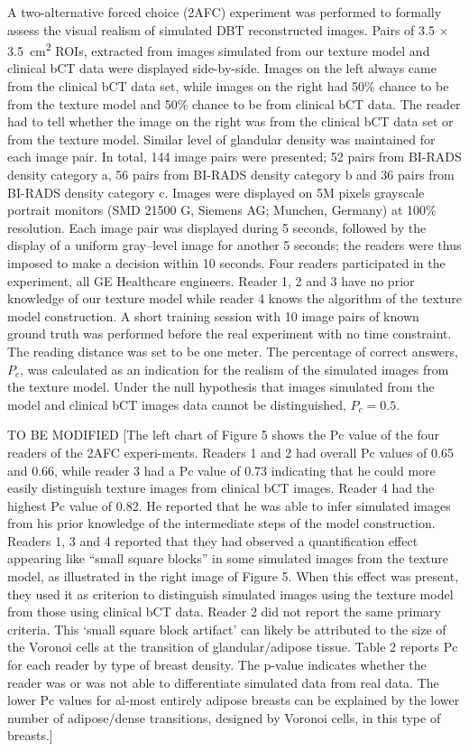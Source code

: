 \documentclass[journal]{IEEEtran}
\begin{document}
A two-alternative forced choice (2AFC) experiment was performed to
formally assess the visual realism of simulated DBT reconstructed
images. Pairs of 3.5 $\times$ \SI{3.5}{\cm\squared} ROIs, extracted
from images simulated from our texture model and clinical bCT data
were displayed side-by-side. Images on the left always came from the
clinical bCT data set, while images on the right had 50\% chance to be
from the texture model and 50\% chance to be from clinical bCT
data. The reader had to tell whether the image on the right was from
the clinical bCT data set or from the texture model. Similar level of
glandular density was maintained for each image pair. In total, 144
image pairs were presented; 52 pairs from BI-RADS density category a,
56 pairs from BI-RADS density category b and 36 pairs from BI-RADS
density category c. Images were displayed on 5M pixels grayscale
portrait monitors (SMD 21500 G, Siemens AG; Munchen, Germany) at 100\%
resolution. Each image pair was displayed during 5 seconds, followed
by the display of a uniform gray–level image for another 5 seconds;
the readers were thus imposed to make a decision within 10
seconds. Four readers participated in the experiment, all GE
Healthcare engineers. Reader 1, 2 and 3 have no prior knowledge of our
texture model while reader 4 knows the algorithm of the texture model
construction. A short training session with 10 image pairs of known
ground truth was performed before the real experiment with no time
constraint. The reading distance was set to be one meter. The
percentage of correct answers, $P_c$, was calculated as an indication
for the realism of the simulated images from the texture model. Under
the null hypothesis that images simulated from the model and clinical
bCT images data cannot be distinguished, $P_c = 0.5$.

TO BE MODIFIED [The left chart of Figure 5 shows the Pc value of the
four readers of the 2AFC experi-ments. Readers 1 and 2 had overall Pc
values of 0.65 and 0.66, while reader 3 had a Pc value of 0.73
indicating that he could more easily distinguish texture images from
clinical bCT images. Reader 4 had the highest Pc value of 0.82. He
reported that he was able to infer simulated images from his prior
knowledge of the intermediate steps of the model construction. Readers
1, 3 and 4 reported that they had observed a quantification effect
appearing like “small square blocks” in some simulated images from the
texture model, as illustrated in the right image of Figure 5. When
this effect was present, they used it as criterion to distinguish
simulated images using the texture model from those using clinical bCT
data. Reader 2 did not report the same primary criteria. This ‘small
square block artifact’ can likely be attributed to the size of the
Voronoi cells at the transition of glandular/adipose tissue. Table 2
reports Pc for each reader by type of breast density. The p-value
indicates whether the reader was or was not able to differentiate
simulated data from real data. The lower Pc values for al-most
entirely adipose breasts can be explained by the lower number of
adipose/dense transitions, designed by Voronoi cells, in this type of
breasts.]
\end{document}
